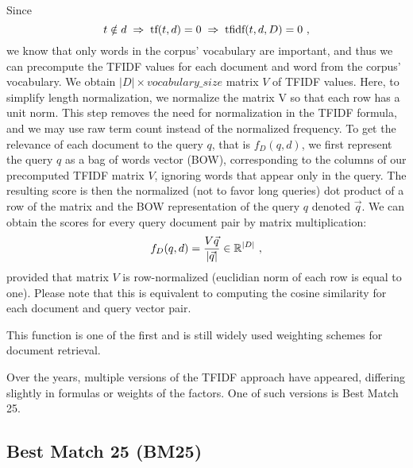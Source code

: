 Since %
$$t\notin d \hspace{1mm}\Rightarrow\hspace{1mm} \text{tf}(t, d) = 0 \hspace{1mm}\Rightarrow\hspace{1mm} \text{tfidf}(t, d, D) = 0\ ,$$
we know that only words in the corpus' vocabulary are important, and thus we can precompute the TFIDF values for each document and word from the corpus' vocabulary.
We obtain $|D|\times {vocabulary\_size}$ matrix $V$ of TFIDF values.
Here, to simplify length normalization, we normalize the matrix V so that each row has a unit norm.
This step removes the need for normalization in the TFIDF formula, and we may use raw term count instead of the normalized frequency.
To get the relevance of each document to the query $q$, that is $f_D(q, d)$, we first represent the query $q$ as a bag of words vector (BOW), corresponding to the columns of our precomputed TFIDF matrix $V$, ignoring words that appear only in the query.
The resulting score is then the normalized (not to favor long queries) dot product of a row of the matrix and the BOW representation of the query $q$ denoted $\vec{q}$.
We can obtain the scores for every query document pair by matrix multiplication:
\begin{equation}
        f_D(q, d) = \frac{V\vec{q}}{|\vec{q}|} \in \mathbb{R}^{|D|}\ ,
\end{equation}
provided that matrix $V$ is row-normalized (euclidian norm of each row is equal to one).
Please note that this is equivalent to computing the cosine similarity for each document and query vector pair.

This function is one of the first and is still widely used \citep{Beel2016} weighting schemes for document retrieval. 

Over the years, multiple versions of the TFIDF approach have appeared, differing slightly in formulas or weights of the factors. One of such versions is Best Match 25. %

\subsection{Best Match 25 (BM25)}

